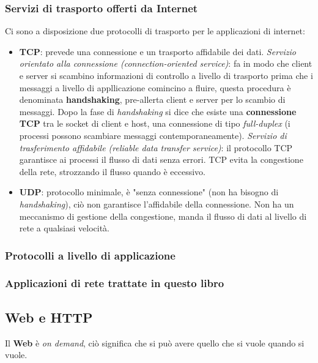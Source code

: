 \subsubsection{Servizi di trasporto offerti da Internet} 
Ci sono a disposizione due protocolli di trasporto per le applicazioni di internet:
\begin{itemize}
  \item \textbf{TCP}: prevede una connessione e un trasporto affidabile dei dati.\newline
    \textit{Servizio orientato alla connessione (connection-oriented service)}: fa in modo che client e server si scambino informazioni di controllo a livello di trasporto prima che i messaggi a livello di appllicazione comincino a fluire, questa procedura è denominata \textbf{handshaking}, pre-allerta client e server per lo scambio di messaggi.\newline
    Dopo la fase di \textit{handshaking} si dice che esiste una \textbf{connessione TCP} tra le socket di client e host, una connessione di tipo \textit{full-duplex} (i processi possono scambiare messaggi contemporaneamente). 
    \textit{Servizio di trasferimento affidabile (reliable data transfer service)}: il protocollo TCP garantisce ai processi il flusso di dati senza errori. \newline
    TCP evita la congestione della rete, strozzando il flusso quando è eccessivo.
  \item \textbf{UDP}: protocollo minimale, è "senza connessione" (non ha bisogno di \textit{handshaking}), ciò non garantisce l'affidabile della connessione. Non ha un meccanismo di gestione della congestione, manda il flusso di dati al livello di rete a qualsiasi velocità. 
\end{itemize}


\subsubsection{Protocolli a livello di applicazione}
\subsubsection{Applicazioni di rete trattate in questo libro}

\subsection{Web e HTTP}
Il \textbf{Web} è \textit{on demand}, ciò significa che si può avere quello che si vuole quando si vuole.

